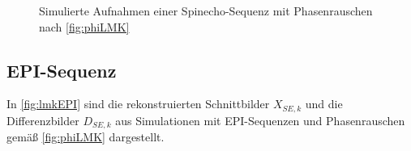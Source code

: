 \begin{figure}[H]
	\hfill
	\hfill
	\caption[LMK04821 Phasenrauschen (Spinecho-Sequenz)]{Simulierte Aufnahmen einer Spinecho-Sequenz mit Phasenrauschen nach \autoref{fig:phiLMK}}
	\label{fig:lmkSE}	
\end{figure}

\subsection{EPI-Sequenz}
In \autoref{fig:lmkEPI} sind die rekonstruierten Schnittbilder $X_{SE,k}$ und die Differenzbilder $D_{SE,k}$ aus Simulationen mit EPI-Sequenzen und Phasenrauschen gemäß \autoref{fig:phiLMK} dargestellt.

